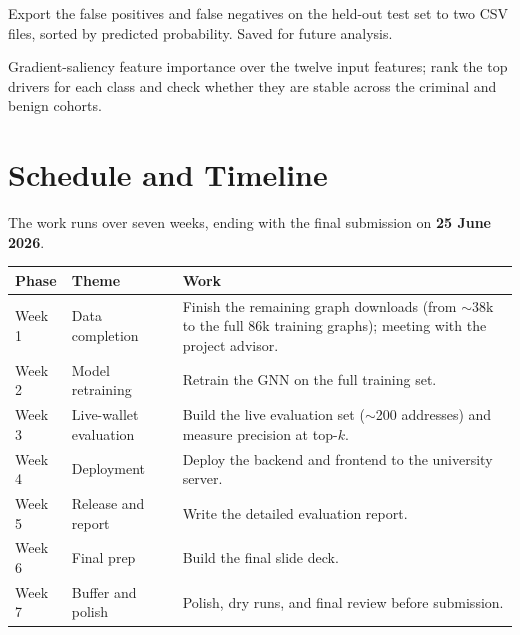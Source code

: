 \documentclass[11pt]{article}
\begin{document}
\begin{description}[leftmargin=0pt,labelindent=0pt,style=nextline,itemsep=4pt,parsep=0pt]
  \item[\textit{Misclassification dump.}] Export the false positives and false negatives on the held-out test
    set to two CSV files, sorted by predicted probability. Saved for future analysis.
  \item[\textit{Interpretability.}] Gradient-saliency feature importance over the twelve input features; rank
    the top drivers for each class and check whether they are stable across the criminal and benign cohorts.
\end{description}

\section{Schedule and Timeline}

The work runs over seven weeks, ending with the final submission on \textbf{25 June 2026}.

\begin{table}[h]
\centering\small
\begin{tabularx}{\linewidth}{l l Y}
\toprule
\textbf{Phase} & \textbf{Theme} & \textbf{Work} \\
\midrule
Week 1 & Data completion       & Finish the remaining graph downloads (from $\sim$38k to the full 86k training graphs); meeting with the project advisor. \\
Week 2 & Model retraining      & Retrain the GNN on the full training set. \\
Week 3 & Live-wallet evaluation & Build the live evaluation set ($\sim$200 addresses) and measure precision at top-$k$. \\
Week 4 & Deployment            & Deploy the backend and frontend to the university server. \\
Week 5 & Release and report    & Write the detailed evaluation report. \\
Week 6 & Final prep            & Build the final slide deck. \\
Week 7 & Buffer and polish     & Polish, dry runs, and final review before submission. \\
\bottomrule
\end{tabularx}
\end{table}
\end{document}
